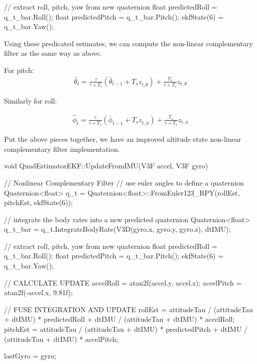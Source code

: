 \documentclass[letterpaper]{article}
\begin{document}
\begin{CPP}
// extract roll, pitch, yaw from new quaternion
float predictedRoll  = q_t_bar.Roll();
float predictedPitch = q_t_bar.Pitch();
ekfState(6)    = q_t_bar.Yaw();
\end{CPP}

Using these predicated estimates, we can compute the non-linear complementary filter as the same way as above.

For pitch:
\begin{align*}
  \hat{\theta}_t = \frac{\tau}{\tau + T_s} \left( \bar{\theta}_{t-1} + T_s z_{t,\dot{\theta}} \right) + \frac{T_s}{\tau + T_s} z_{t,\theta}
\end{align*}

Similarly for roll: 

\begin{align*}
  \hat{\phi}_t = \frac{\tau}{\tau + T_s} \left( \bar{\phi}_{t-1} + T_s z_{t,\dot{\phi}} \right) + \frac{T_s}{\tau + T_s} z_{t,\phi}
\end{align*}

Put the above pieces together, we have an improved altitude state non-linear complementary filter implementation.
\begin{CPP}
void QuadEstimatorEKF::UpdateFromIMU(V3F accel, V3F gyro)
{
    // Nonlinear Complementary Filter
    // use euler angles to define a quaternion
    Quaternion<float> q_t = Quaternion<float>::FromEuler123_RPY(rollEst, pitchEst, ekfState(6));

    // integrate the body rates into a new predicted quaternion
    Quaternion<float>  q_t_bar = q_t.IntegrateBodyRate(V3D(gyro.x, gyro.y, gyro.z), dtIMU);

    // extract roll, pitch, yaw from new quaternion
    float predictedRoll  = q_t_bar.Roll();
    float predictedPitch = q_t_bar.Pitch();
    ekfState(6)    = q_t_bar.Yaw();

    // CALCULATE UPDATE
    accelRoll = atan2f(accel.y, accel.z);
    accelPitch = atan2f(-accel.x, 9.81f);

    // FUSE INTEGRATION AND UPDATE
    rollEst = attitudeTau / (attitudeTau + dtIMU) * predictedRoll +
                  dtIMU / (attitudeTau + dtIMU) * accelRoll;
    pitchEst = attitudeTau / (attitudeTau + dtIMU) * predictedPitch +
                   dtIMU / (attitudeTau + dtIMU) * accelPitch;

    lastGyro = gyro;
}
\end{CPP}
\end{document}
